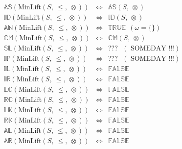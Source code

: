 \documentclass[10pt]{article}
\newcommand{\propname}[1]{{\mathbb{#1}}}
\begin{document}

\[
\begin{array}{rcl} 
\propname{AS}(\mathrm{MinLift}(S,\ \leq,\ \otimes)) 
  & \Leftrightarrow 
  & \propname{AS}(S,\ \otimes)
  \\ 
\propname{ID}(\mathrm{MinLift}(S,\ \leq,\ \otimes)) 
  & \Leftrightarrow 
  & \propname{ID}(S,\ \otimes)
  \\ 
\propname{AN}(\mathrm{MinLift}(S,\ \leq,\ \otimes)) 
  & \Leftrightarrow 
  & \propname{TRUE} \ \ (\omega = \{\})
  \\ 
\propname{CM}(\mathrm{MinLift}(S,\ \leq,\ \otimes)) 
  & \Leftrightarrow 
  & \propname{CM}(S,\ \otimes)
  \\ 
\propname{SL}(\mathrm{MinLift}(S,\ \leq,\ \otimes)) 
  & \Leftrightarrow 
  & ??? \ \ \ (\mbox{  SOMEDAY !!!})
  \\ 
\propname{IP}(\mathrm{MinLift}(S,\ \leq,\ \otimes)) 
  & \Leftrightarrow 
  & ??? \ \ \ (\mbox{  SOMEDAY !!!})
  \\ 
\propname{IL}(\mathrm{MinLift}(S,\ \leq,\ \otimes)) 
  & \Leftrightarrow 
  & \propname{FALSE} 
  \\ 
\propname{IR}(\mathrm{MinLift}(S,\ \leq,\ \otimes)) 
  & \Leftrightarrow 
  & \propname{FALSE} 
  \\ 
\propname{LC}(\mathrm{MinLift}(S,\ \leq,\ \otimes)) 
  & \Leftrightarrow 
  & \propname{FALSE} 
  \\ 
\propname{RC}(\mathrm{MinLift}(S,\ \leq,\ \otimes)) 
  & \Leftrightarrow 
  & \propname{FALSE} 
  \\ 
\propname{LK}(\mathrm{MinLift}(S,\ \leq,\ \otimes)) 
  & \Leftrightarrow 
  & \propname{FALSE} 
  \\ 
\propname{RK}(\mathrm{MinLift}(S,\ \leq,\ \otimes)) 
  & \Leftrightarrow 
  & \propname{FALSE} 
  \\ 
\propname{AL}(\mathrm{MinLift}(S,\ \leq,\ \otimes))  
  & \Leftrightarrow 
  &  \propname{FALSE} 
  \\ 
\propname{AR}(\mathrm{MinLift}(S,\ \leq,\ \otimes))  
  & \Leftrightarrow 
  & \propname{FALSE}  
  \\ 
\end{array} 
\] 
\end{document}
